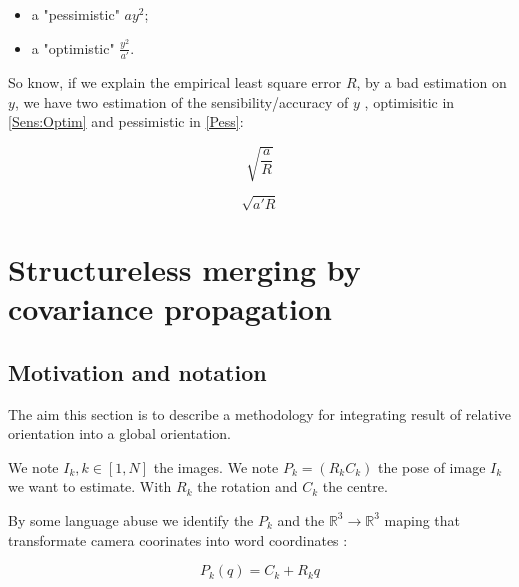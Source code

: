 \begin{itemize}
   \item a "pessimistic" $a y^2$;
   \item a "optimistic" $\frac{y^2}{a'}$.
\end{itemize}

So know, if we explain the empirical least square error $R$, by
a bad estimation on $y$, we have two estimation of the sensibility/accuracy of $y$ ,
optimisitic in \ref{Sens:Optim} and pessimistic in \ref{Pess}:

\begin{equation}
  \sqrt{\frac{a}{R}}
  \label{Sens:Optim}
\end{equation}


\begin{equation}
  \sqrt{a'R}
  \label{Sens:Pess}
\end{equation}


\section{Structureless merging by covariance propagation}

\subsection{Motivation and notation}

The aim this section is to describe a methodology for integrating
result of relative orientation into a global orientation.

We note  $I_k, k \in [1,N] $ the images.
We note  $P_k = (R_k C_k) $ the pose of image $I_k$ we want to estimate.
With $R_k$ the rotation and $C_k$ the centre.

By some language abuse we identify the $P_k$ and the $\mathbb{R}^3 \to  \mathbb{R}^3$ maping
that transformate camera coorinates into word coordinates :

\begin{equation}
   P_k(q) = C_k + R_k q
\end{equation}


\begin{center}
\end{center}

